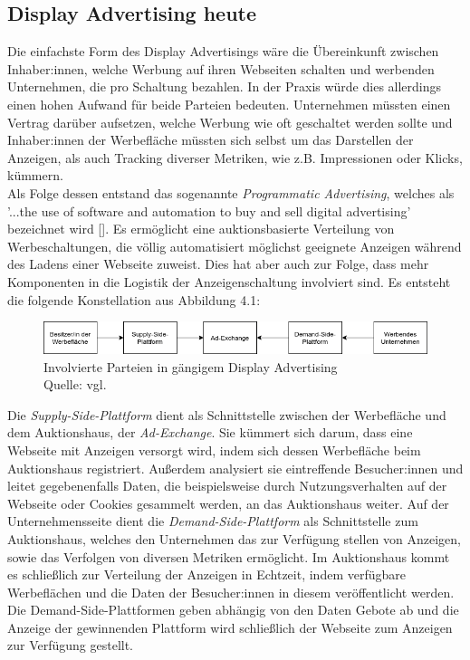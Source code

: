 \subsection{Display Advertising heute}
Die einfachste Form des Display Advertisings wäre die Übereinkunft zwischen Inhaber:innen, welche Werbung auf ihren Webseiten schalten und werbenden Unternehmen, die pro Schaltung bezahlen. In der Praxis würde dies allerdings einen hohen Aufwand für beide Parteien bedeuten. Unternehmen müssten einen Vertrag darüber aufsetzen, welche Werbung wie oft geschaltet werden sollte und Inhaber:innen der Werbefläche müssten sich selbst um das Darstellen der Anzeigen, als auch Tracking diverser Metriken, wie z.B. Impressionen oder Klicks, kümmern.\\

Als Folge dessen entstand das sogenannte \emph{Programmatic Advertising}, welches als '...the use of software and automation to buy and sell digital advertising' bezeichnet wird [\cite[4]{optimity_advisors_2019}]. Es ermöglicht eine auktionsbasierte Verteilung von Werbeschaltungen, die völlig automatisiert möglichst geeignete Anzeigen während des Ladens einer Webseite zuweist. Dies hat aber auch zur Folge, dass mehr Komponenten in die Logistik der Anzeigenschaltung involviert sind. Es entsteht die folgende Konstellation aus Abbildung 4.1:

\begin{figure}[htpb]
	\centering
	\includegraphics[width=\textwidth]{images/programmatic_advertising.png}
	\caption{Involvierte Parteien in gängigem Display Advertising\\
	Quelle: vgl. \cite[9]{optimity_advisors_2019}}
	\label{6braun:fig:programmatic_advertising}
\end{figure}
Die \emph{Supply-Side-Plattform} dient als Schnittstelle zwischen der Werbefläche und dem Auktionshaus, der \emph{Ad-Exchange}. Sie kümmert sich darum, dass eine Webseite mit Anzeigen versorgt wird, indem sich dessen Werbefläche beim Auktionshaus registriert. Außerdem analysiert sie eintreffende Besucher:innen und leitet gegebenenfalls Daten, die beispielsweise durch Nutzungsverhalten auf der Webseite oder Cookies gesammelt werden, an das Auktionshaus weiter. Auf der Unternehmensseite dient die \emph{Demand-Side-Plattform} als Schnittstelle zum Auktionshaus, welches den Unternehmen das zur Verfügung stellen von Anzeigen, sowie das Verfolgen von diversen Metriken ermöglicht. Im Auktionshaus kommt es schließlich zur Verteilung der Anzeigen in Echtzeit, indem verfügbare Werbeflächen und die Daten der Besucher:innen in diesem veröffentlicht werden. Die Demand-Side-Plattformen geben abhängig von den Daten Gebote ab und die Anzeige der gewinnenden Plattform wird schließlich der Webseite zum Anzeigen zur Verfügung gestellt.\\

